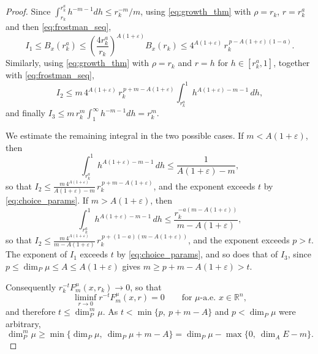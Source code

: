 \documentclass[12pt]{amsart}
\theoremstyle{definition}
\theoremstyle{remark}
\numberwithin{equation}{section}
\begin{document}
\begin{proof}
Since 
$\int_{r_k}^{r_k^{a}}h^{-m-1}dh\leq r_k^{-m}/m$, using
\eqref{eq:growth_thm} with $\rho=r_k$, $r=r_k^{a}$ and then
\eqref{eq:frostman_seq},
$$I_1\leq B_{x}(r_k^{a})
\leq\left(\frac{4r_k^{a}}{r_k}\right)^{A(1+\varepsilon)}B_{x}(r_k)
\leq 4^{A(1+\varepsilon)}\,r_k^{\,p-A(1+\varepsilon)(1-a)}.$$
Similarly, using \eqref{eq:growth_thm} with $\rho=r_k$ and $r=h$ for
$h\in[r_k^{a},1]$, together with \eqref{eq:frostman_seq},
$$I_2\leq m\,4^{A(1+\varepsilon)}\,r_k^{\,p+m-A(1+\varepsilon)}
\int_{r_k^{a}}^{1}h^{A(1+\varepsilon)-m-1}\,dh,$$
and finally $I_3\leq m\,r_k^{m}\int_{1}^{\infty}h^{-m-1}dh=r_k^{m}$.

We estimate the remaining integral in the two possible cases. If
$m<A(1+\varepsilon)$, then
$$\int_{r_k^{a}}^{1}h^{A(1+\varepsilon)-m-1}\,dh
\leq\frac{1}{A(1+\varepsilon)-m},$$
so that $I_2\leq\frac{m\,4^{A(1+\varepsilon)}}{A(1+\varepsilon)-m}\,
r_k^{\,p+m-A(1+\varepsilon)}$, and the exponent exceeds $t$ by
\eqref{eq:choice_params}. If $m>A(1+\varepsilon)$, then
$$\int_{r_k^{a}}^{1}h^{A(1+\varepsilon)-m-1}\,dh
\leq\frac{r_k^{-a(m-A(1+\varepsilon))}}{m-A(1+\varepsilon)},$$
so that $I_2\leq\frac{m\,4^{A(1+\varepsilon)}}{m-A(1+\varepsilon)}\,
r_k^{\,p+(1-a)(m-A(1+\varepsilon))}$, and the exponent exceeds $p>t$.
The exponent of $I_1$ exceeds $t$ by \eqref{eq:choice_params}, and so
does that of $I_3$, since $p\leq\dim_P\mu\leq A\leq A(1+\varepsilon)$
gives $m\geq p+m-A(1+\varepsilon)>t$.

Consequently $r_k^{-t}F_{m}^{\mu}(x,r_k)\to 0$, so that
$$\liminf_{r\to 0}r^{-t}F_{m}^{\mu}(x,r)=0
\qquad\text{for }\mu\text{-a.e.\ }x\in\mathbb{R}^n,$$
and therefore $t\leq\dim_P^m\mu$. As $t<\min\{p,\ p+m-A\}$ and
$p<\dim_P\mu$ were arbitrary,
$$\dim_P^m\mu\geq\min\{\dim_P\mu,\ \dim_P\mu+m-A\}
=\dim_P\mu-\max\{0,\ \dim_A E-m\}.$$
\end{proof}
\end{document}

